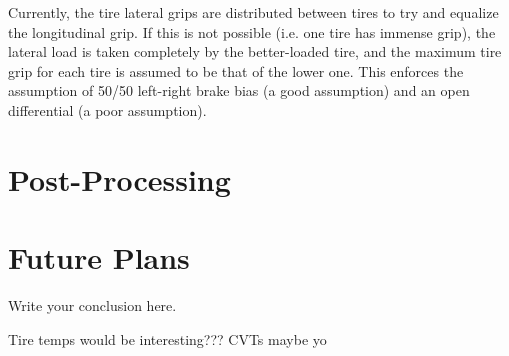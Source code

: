 \documentclass{article}
\begin{document}
Currently, the tire lateral grips are distributed between tires to try and equalize the longitudinal grip. If this is not possible (i.e. one tire has immense grip), the lateral load is taken completely by the better-loaded tire, and the maximum tire grip for each tire is assumed to be that of the lower one. This enforces the assumption of 50/50 left-right brake bias (a good assumption) and an open differential (a poor assumption).

\section{Post-Processing}

\section{Future Plans}
Write your conclusion here.

Tire temps would be interesting???
CVTs maybe yo
\end{document}
